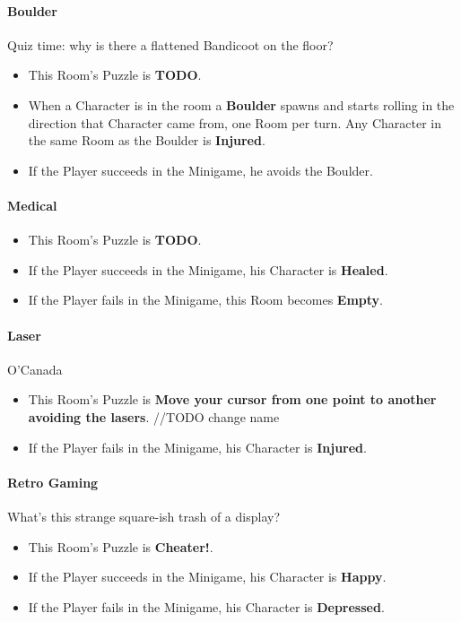 \paragraph{Boulder} Quiz time: why is there a flattened Bandicoot on the floor?
\begin{itemize}
	\item This Room's Puzzle is \textbf{TODO}.
	\item When a Character is in the room a \textbf{Boulder} spawns and starts rolling in the direction that Character came from, one Room per turn. Any Character in the same Room as the Boulder is \textbf{Injured}.
	\item If the Player succeeds in the Minigame, he avoids the Boulder.
\end{itemize}

\paragraph{Medical} 
\begin{itemize}
	\item This Room's Puzzle is \textbf{TODO}.
	\item If the Player succeeds in the Minigame, his Character is \textbf{Healed}.
	\item If the Player fails    in the Minigame, this Room becomes \textbf{Empty}.
\end{itemize}

\paragraph{Laser} O'Canada
\begin{itemize}
	\item This Room's Puzzle is \textbf{Move your cursor from one point to another avoiding the lasers}. //TODO change name
	\item If the Player fails    in the Minigame, his Character is \textbf{Injured}.
\end{itemize}

\paragraph{Retro Gaming} What's this strange square-ish trash of a display?
\begin{itemize}
	\item This Room's Puzzle is \textbf{Cheater!}.
	\item If the Player succeeds in the Minigame, his Character is \textbf{Happy}.
	\item If the Player fails    in the Minigame, his Character is \textbf{Depressed}.
\end{itemize}

